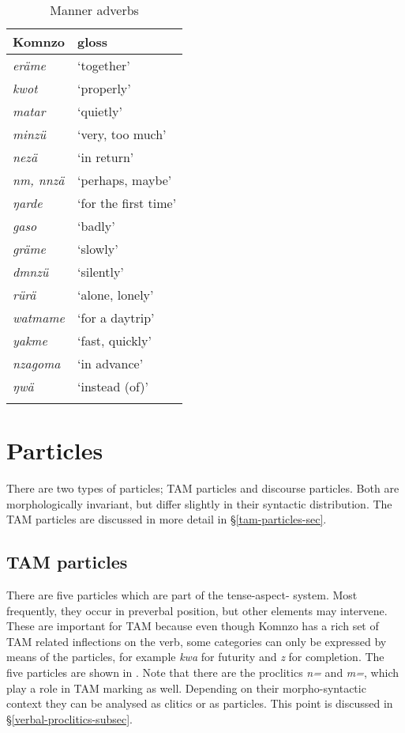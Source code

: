 \begin{table}
\caption{Manner adverbs}
\label{manner-adverbs-table}
	\begin{tabularx}{.5\textwidth}{Xl}
		\lsptoprule
		Komnzo&gloss\\\midrule
		\emph{eräme}&`together'\\
		\emph{kwot}&`properly'\\
		\emph{matar}&`quietly'\\
		\emph{minzü}&`very, too much'\\
		\emph{nezä}&`in return'\\
		\emph{nm, nnzä}&`perhaps, maybe'\\
		\emph{ŋarde}&`for the first time'\\
		\emph{gaso}&`badly'\\
		\emph{gräme}&`slowly'\\
		\emph{dmnzü}&`silently'\\
		\emph{rürä}&`alone, lonely'\\
		\emph{watmame}&`for a daytrip'\\
		\emph{yakme}&`fast, quickly'\\
		\emph{nzagoma}&`in advance'\\
		\emph{ŋwä}&`instead (of)'\\
		\lspbottomrule
	\end{tabularx}
\end{table}%

\section{Particles} \label{particles-sec}

There are two types of particles; TAM particles and discourse particles. Both are morphologically invariant, but differ slightly in their syntactic distribution. The TAM particles are discussed in more detail in {\S}\ref{tam-particles-sec}.

\subsection{TAM particles} \label{tam-particles-subsec}
There are five particles which are part of the tense-aspect- system. Most frequently, they occur in preverbal position, but other elements may intervene. These are important for TAM because even though Komnzo has a rich set of TAM related inflections on the verb, some categories can only be expressed by means of the particles, for example \emph{kwa} for futurity and \emph{z} for completion. The five particles are shown in . Note that there are the proclitics \emph{n=} and \emph{m=}, which play a role in TAM marking as well. Depending on their morpho-syntactic context they can be analysed as clitics or as particles. This point is discussed in {\S}\ref{verbal-proclitics-subsec}.

